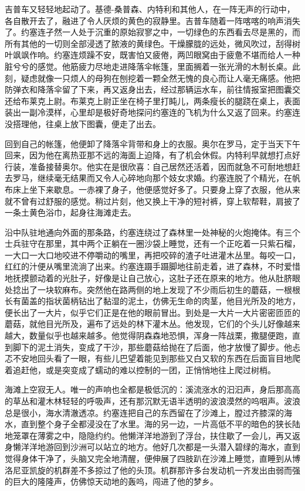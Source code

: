     吉普车又轻轻地起动了。基德-桑普森、内特利和其他人，在一阵无声的行动中，各自散开去了，融进了令人厌烦的黄色的寂静里。吉普车随着一阵喀喀的响声消失了。约塞连孑然一人处于沉重的原始寂寥之中，一切绿色的东西看去尽是黑的，而所有其他的一切则全部浸透了脓液的黄绿色。干燥朦胧的远处，微风吹过，刮得树叶飒飒作响。约塞连烦躁不安，既害怕又疲倦，两凹眼窝由于疲惫不堪而给人一种脏兮兮的感觉。他筋疲力尽地走进降落伞帐篷，里面搁着一张光滑的木制长桌。此刻，疑虑就像一只烦人的母狗在刨挖着一颗全然无愧的良心而让人毫无痛感。他把防弹衣和降落伞留了下来，再又返身出去，经过那辆运水车，前往情报室把图囊交还给布莱克上尉。布莱克上尉正坐在椅子里打盹儿，两条瘦长的腿跷在桌上，表面装出一副冷漠样，心里却是极好奇地探问约塞连的飞机为什么又返了回来。约塞连没搭理他，往桌上放下图囊，便走了出去。

    回到自己的帐篷，他便卸了降落伞背带和身上的衣服。奥尔在罗马，定于当天下午回来，因为他在离热亚那不远的海面上迫降，有了机会休假。内特利早就想打点好行装，准备接替奥尔。他实在是很欣喜：自己居然还活着，因而就急不可耐地想赶去罗马，继续毫无结果而又令人心碎地向那个妓女求婚。约塞连脱了个精光，在帆布床上坐下来歇息。一赤裸了身子，他便感觉好多了。只要身上穿了衣服，他从来就不曾有过舒服的感觉。稍过片刻，他又换上干净的短衬裤，穿上软帮鞋，肩披了一条土黄色浴巾，起身往海滩走去。

 


    沿中队驻地通向外面的那条路，约塞连绕过了森林里一处神秘的火炮掩体。有三个士兵驻守在那里，其中两个正躺在一圈沙袋上睡觉，还有一个正吃着一只紫石榴，一大口一大口地咬进不停嚼动的嘴里，再把咬碎的渣子吐进灌木丛里。每咬一口，红红的汁便从嘴里流淌了出来。约塞连蹑手蹑脚地往前走着，进了森林，不时爱惜地抚摸颤动着的光肚子，好像是让自己放心，这肚子还在原来的地方。他从肚脐眼处捻出了一块软麻布。突然他在路两侧的地上发现了不少雨后初生的蘑菇，一根根长有菌盖的指状菌柄钻出了黏湿的泥土，仿佛无生命的肉茎，他目光所及的地方，便长出了一大片，似乎它们正是在他的眼前冒出。到处是一大片一大片密密匝匝的蘑菇，就他目光所及，遍布了远处的林下灌木丛。他发现，它们的个头儿好像越来越大，数量似乎也越来越多。他觉得阴森森地恐惧，浑身一阵战栗，撒腿便跑，直到脚下的泥土消失，变成了干沙，那些蘑菇给抛在了后面，他才放慢了脚步。他忐忑不安地回头看了一眼，有些儿巴望着能见到那些又白又软的东西在后面盲目地爬着追赶他，或是突变成了蠕动的难以控制的一团，正悄悄地往上爬过树梢。

    海滩上空寂无人。唯一的声响也全都是极低沉的：溪流涨水的汩汩声，身后那高高的草丛和灌木林轻轻的呼吸声，还有那沉默无语半透明的波浪漠然的呜咽声。波浪总是很小，海水清澈透凉。约塞连把自己的东西留在了沙滩上，膛过齐膝深的海水，直到整个身子全都浸没在了水里。海的另一边，一片高低不平的暗色的狭长陆地笼罩在薄雾之中，隐隐约约。他懒洋洋地游到了浮台，扶住歇了一会儿，再又返身懒洋洋地游回到沙洲可以站立的地方。他好几次都是一头潜入碧绿的海水，直到觉得身体干净了，头脑又完全地清醒，便伸展了四肢趴在沙滩上睡觉，直睡到从博洛尼亚凯旋的机群差不多掠过了他的头顶。机群那许多台发动机一齐发出由弱而强的巨大的隆隆声，仿佛惊天动地的轰呜，闯进了他的梦乡。


